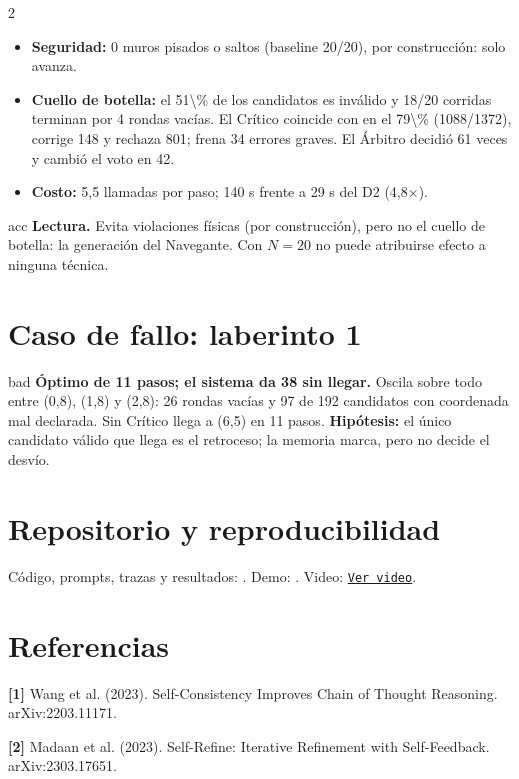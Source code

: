 \documentclass[9pt,letterpaper]{extarticle}
\begin{document}
\begin{multicols}{2}
\begin{itemize}
\item \textbf{\color{acc!85!black}Seguridad:} 0 muros pisados o saltos (baseline \num{20/20}), por construcción: solo  avanza.
\item \textbf{\color{warc!85!black}Cuello de botella:} el \num{51\%} de los candidatos es inválido y \num{18/20} corridas terminan por 4 rondas vacías. El Crítico coincide con  en el \num{79\%} (\num{1088/1372}), corrige \num{148} y rechaza \num{801};  frena \num{34} errores graves. El Árbitro decidió \num{61} veces y cambió el voto en \num{42}.
\item \textbf{Costo:} 5,5 llamadas por paso; 140 s frente a 29 s del D2 (4,8$\times$).
\end{itemize}
\begin{callout}{acc}
\textbf{\color{acc!80!black}Lectura.} Evita violaciones físicas (por construcción), pero no el cuello de botella: la generación del Navegante. Con $N=20$ no puede atribuirse efecto a ninguna técnica.
\end{callout}

\section{Caso de fallo: laberinto 1}
\begin{callout}{bad}
\textbf{\color{badx}Óptimo de 11 pasos; el sistema da 38 sin llegar.} Oscila sobre todo entre (0,8), (1,8) y (2,8): 26 rondas vacías y 97 de 192 candidatos con coordenada mal declarada. Sin Crítico llega a (6,5) en 11 pasos. \textbf{Hipótesis:} el único candidato válido que llega es el retroceso; la memoria marca, pero no decide el desvío.
\end{callout}

\section{Repositorio y reproducibilidad}
Código, prompts, trazas y resultados: \href{https://github.com/Cata-X/GenIA}{}. Demo: . Video: \href{https://drive.google.com/file/d/1YE0ZFvhj2wjon41MpgBRfoleRD-NYLg8/view?usp=sharing}{\colorbox{wart}{\texttt{\color{warc}Ver video}}}.

\section{Referencias}
{\fontsize{6.9}{7.8}\selectfont
\textcolor{pri}{\bfseries[1]} Wang et al. (2023). Self-Consistency Improves Chain of Thought Reasoning. arXiv:2203.11171.\par
\textcolor{pri}{\bfseries[2]} Madaan et al. (2023). Self-Refine: Iterative Refinement with Self-Feedback. arXiv:2303.17651.\par}
\end{multicols}
\end{document}
